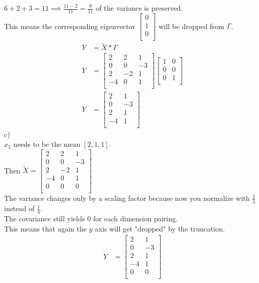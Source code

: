 \begin{flushleft}
$6 + 2 + 3 = 11 \implies \frac{11-2}{11} = \frac{9}{11}$ of the  variance is preserved.
\\
This means the corresponding eigenvector
$
\begin{bmatrix}
0 \\
1 \\
0 \\
\end{bmatrix}
$ will be dropped from $\Gamma$.
\\
\begin{align*}
Y &= \widetilde{X} * \Gamma
\\
Y &=
\begin{bmatrix}
2 & 2 & 1 \\
0 & 0 & -3 \\
2 & -2 & 1 \\
-4 & 0 & 1 \\
\end{bmatrix}
\begin{bmatrix}
1 & 0 \\
0 & 0 \\
0 & 1 \\
\end{bmatrix}
\\
Y &= 
\begin{bmatrix}
2 & 1 \\
0 & -3 \\
2 & 1 \\
-4 & 1 \\
\end{bmatrix}
\end{align*}
c)
\\
$x_{5}$ needs to be the mean $[2, 1, 1]$.\\
Then $\widetilde{X} = 
\begin{bmatrix}
2 & 2 & 1 \\
0 & 0 & -3 \\
2 & -2 & 1 \\
-4 & 0 & 1 \\
0 & 0 & 0 \\
\end{bmatrix}
$
\\
The variance changes only by a scaling factor because 
now you normalize with $\frac{1}{5}$ instead of $\frac{1}{4}$.\\
The covariance still yields $0$ for each dimension pairing.\\
This means that again the $y$ axis will get "dropped" by the truncation.
\begin{align*}
Y &= 
\begin{bmatrix}
2 & 1 \\
0 & -3 \\
2 & 1 \\
-4 & 1 \\
0 & 0 \\
\end{bmatrix}
\end{align*}
\end{flushleft}
%
%
%



